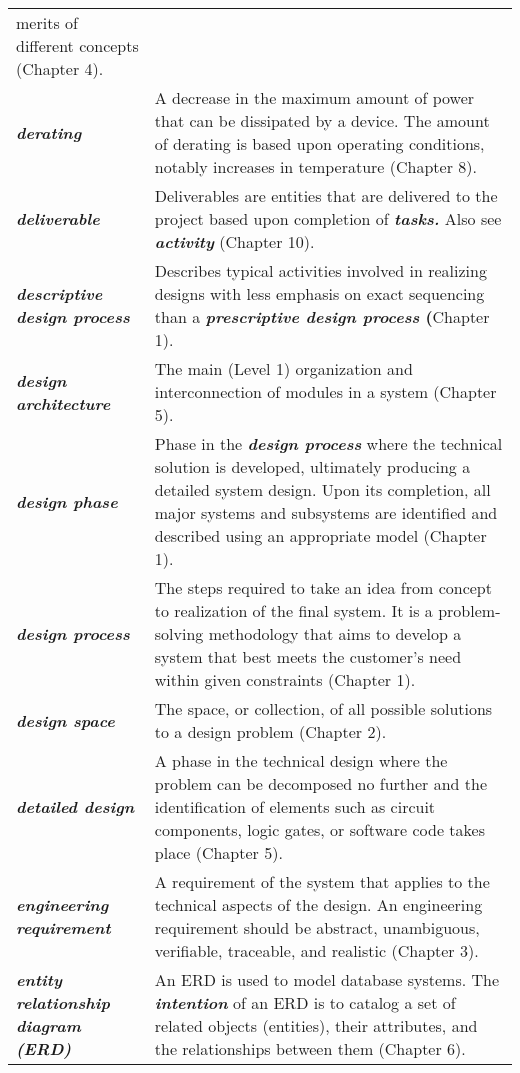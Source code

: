 \begin{longtable} { p{4cm} p{11cm}}
merits of different concepts (Chapter 4). \\
\emph{\textbf{derating}} & A decrease in the maximum amount of power
that can be dissipated by a device. The amount of derating is based upon
operating conditions, notably increases in temperature (Chapter 8). \\
\emph{\textbf{deliverable}} & Deliverables are entities that are
delivered to the project based upon completion of \emph{\textbf{tasks.}}
Also see \emph{\textbf{activity}} (Chapter 10). \\
\emph{\textbf{descriptive design process}} & Describes typical
activities involved in realizing designs with less emphasis on exact
sequencing than a \textbf{\emph{prescriptive design process} (}Chapter
1). \\
\emph{\textbf{design architecture}} & The main (Level 1) organization
and interconnection of modules in a system (Chapter 5). \\
\emph{\textbf{design phase}} & Phase in the \emph{\textbf{design
process}} where the technical solution is developed, ultimately
producing a detailed system design. Upon its completion, all major
systems and subsystems are identified and described using an appropriate
model (Chapter 1). \\
\emph{\textbf{design process}} & The steps required to take an idea from
concept to realization of the final system. It is a problem-solving
methodology that aims to develop a system that best meets the customer's
need within given constraints (Chapter 1). \\
\emph{\textbf{design space}} & The space, or collection, of all possible
solutions to a design problem (Chapter 2). \\
\emph{\textbf{detailed design}} & A phase in the technical design where
the problem can be decomposed no further and the identification of
elements such as circuit components, logic gates, or software code takes
place (Chapter 5). \\
\emph{\textbf{engineering requirement}} & A requirement of the system
that applies to the technical aspects of the design. An engineering
requirement should be abstract, unambiguous, verifiable, traceable, and
realistic (Chapter 3). \\
\emph{\textbf{entity relationship diagram (ERD)}} & An ERD is used to
model database systems. The \emph{\textbf{intention}} of an ERD is to
catalog a set of related objects (entities), their attributes, and the
relationships between them (Chapter 6). \\

\end{longtable}
